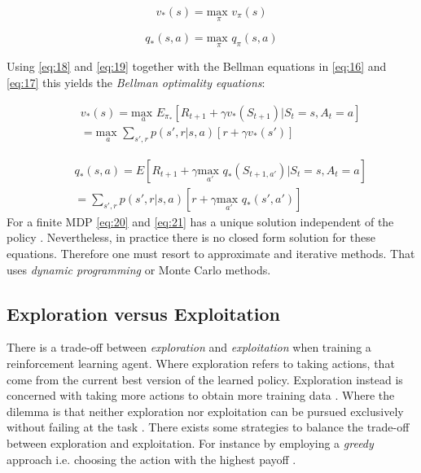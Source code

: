 \documentclass{kththesis}
\theoremstyle{definition}
\begin{document}
\begin{equation}
    \label{eq:18}
    v_{*}(s) = \underset{\pi}{\text{max }} v_{\pi}(s)
\end{equation}

\begin{equation}
    \label{eq:19}
    q_{*}(s,a) = \underset{\pi}{\text{max }} q_{\pi}(s,a)
\end{equation}

Using \autoref{eq:18} and \autoref{eq:19} together with the Bellman equations in \autoref{eq:16} and \autoref{eq:17} this yields the \textit{Bellman optimality equations}:

\begin{equation}
\label{eq:20}
\begin{aligned}
& & v_{*}(s) =  \underset{a}{\text{max }} 
E_{\pi_{*}}[R_{t+1} + \gamma v_{*}(S_{t+1}) | S_t =s, A_t = a] \\
& & = \underset{a}{\text{max }} 
\sum_{s', r}^{}{p(s', r | s,a)}[r + \gamma v_{*}(s')]
\end{aligned}
\end{equation}

\begin{equation}
\label{eq:21}
\begin{aligned}
& & q_{*}(s,a) = 
E[R_{t+1} + \gamma \underset{a'}{\text{max }}q_{*}(S_{t+1, a'}) | S_t =s, A_t = a] \\
& & =  \sum_{s', r}^{}{p(s', r | s,a)}[r + \gamma \underset{a'}{\text{max }}q_{*}(s',a')]
\end{aligned}
\end{equation}
For a finite MDP \autoref{eq:20} and \autoref{eq:21} has a unique solution independent of the policy \parencite{sutton1998reinforcement}. Nevertheless, in practice there is no closed form solution for these equations. Therefore one must resort to approximate and iterative methods. That uses \textit{dynamic programming} or Monte Carlo methods.

\subsection{Exploration versus Exploitation}
There is a trade-off between \textit{exploration} and \textit{exploitation} when training a reinforcement learning agent. Where exploration refers to taking actions, that come from the current best version of the learned policy. Exploration instead is concerned with taking more actions to obtain more training data \parencite{goodfellow2016deep}. Where the dilemma is that neither exploration nor exploitation can be pursued exclusively without failing at the task \parencite{sutton1998reinforcement}. There exists some strategies to balance the trade-off between exploration and exploitation. For instance by employing a \textit{greedy} approach i.e. choosing the action with the highest payoff \parencite{sutton1998reinforcement, szepesvari2009algorithms}.
\end{document}
